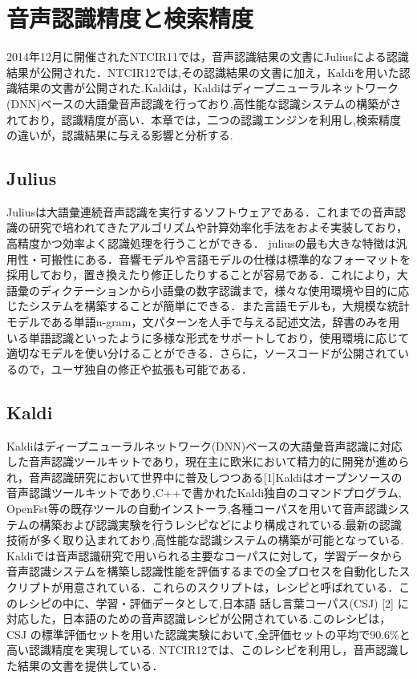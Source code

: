 \chapter{音声認識精度と検索精度}


2014年12月に開催されたNTCIR11では，音声認識結果の文書にJuliusによる認識結果が公開された．NTCIR12では,その認識結果の文書に加え，Kaldiを用いた認識結果の文書が公開された.Kaldiは，Kaldiはディープニューラルネットワーク(DNN)ベースの大語彙音声認識を行っており,高性能な認識システムの構築がされており，認識精度が高い．本章では，二つの認識エンジンを利用し,検索精度の違いが，認識結果に与える影響と分析する.


\section{Julius}
Juliusは大語彙連続音声認識を実行するソフトウェアである．これまでの音声認識の研究で培われてきたアルゴリズムや計算効率化手法をおよそ実装しており，高精度かつ効率よく認識処理を行うことができる．
juliusの最も大きな特徴は汎用性・可搬性にある．音響モデルや言語モデルの仕様は標準的なフォーマットを採用しており，置き換えたり修正したりすることが容易である．これにより，大語彙のディクテーションから小語彙の数字認識まで，様々な使用環境や目的に応じたシステムを構築することが簡単にできる．また言語モデルも，大規模な統計モデルである単語n-gram，文パターンを人手で与える記述文法，辞書のみを用いる単語認識といったように多様な形式をサポートしており，使用環境に応じて適切なモデルを使い分けることができる．さらに，ソースコードが公開されているので，ユーザ独自の修正や拡張も可能である．

\section{Kaldi}
Kaldiはディープニューラルネットワーク(DNN)ベースの大語彙音声認識に対応した音声認識ツールキットであり，現在主に欧米において精力的に開発が進められ，音声認識研究において世界中に普及しつつある[1]Kaldiはオープンソースの音声認識ツールキットであり,C++で書かれたKaldi独自のコマンドプログラム, OpenFst等の既存ツールの自動インストーラ,各種コーパスを用いて音声認識システムの構築および認識実験を行うレシピなどにより構成されている.最新の認識技術が多く取り込まれており,高性能な認識システムの構築が可能となっている.
Kaldiでは音声認識研究で用いられる主要なコーパスに対して，学習データから音声認識システムを構築し認識性能を評価するまでの全プロセスを自動化したスクリプトが用意されている．これらのスクリプトは，レシピと呼ばれている．このレシピの中に、学習・評価データとして,日本語 話し言葉コーパス(CSJ) [2] に対応した，日本語のための音声認識レシピが公開されている.このレシピは，CSJ の標準評価セットを用いた認識実験において,全評価セットの平均で90.6\%と高い認識精度を実現している. NTCIR12では、このレシピを利用し，音声認識した結果の文書を提供している．


